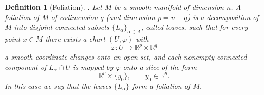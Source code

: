 \documentclass[11pt]{article}
\newtheorem{definition}{Definition}
\begin{document}
\begin{definition}[Foliation]
\label{def:foliation}.
Let $M$ be a smooth manifold of dimension $n$. A \emph{foliation} of $M$
of codimension $q$ (and dimension $p=n-q$) is a decomposition of $M$
into disjoint connected subsets $\{L_\alpha\}_{\alpha\in A}$, called
\emph{leaves}, such that for every point $x\in M$ there exists a chart
$(U,\varphi)$ with
\[
  \varphi:U \to \mathbb{R}^p\times\mathbb{R}^q
\]
a smooth coordinate changes onto an open set, and each nonempty connected component
of $L_\alpha\cap U$ is mapped by $\varphi$ onto a slice of the form
\[
  \mathbb{R}^p\times\{y_0\},
  \qquad y_0\in\mathbb{R}^q.
\]
In this case we say that the leaves $\{L_\alpha\}$ form a foliation of
$M$.
\end{definition}





\end{document}
